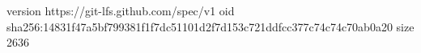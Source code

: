 version https://git-lfs.github.com/spec/v1
oid sha256:14831f47a5bf799381f1f7dc51101d2f7d153c721ddfcc377c74c74c70ab0a20
size 2636
